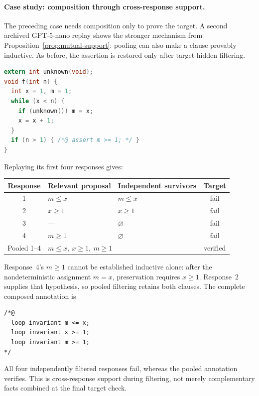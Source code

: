 \noindent\begin{minipage}{\textwidth}
\paragraph{Case study: composition through cross-response support.}
The preceding case needs composition only to prove the target.  A second
archived GPT-5-nano replay shows the stronger mechanism from
Proposition~\ref{prop:mutual-support}: pooling can also make a clause provably
inductive.  As before, the assertion is restored only after target-hidden
filtering.

\begin{lstlisting}[language=C]
extern int unknown(void);
void f(int n) {
  int x = 1, m = 1;
  while (x < n) {
    if (unknown()) m = x;
    x = x + 1;
  }
  if (n > 1) { /*@ assert m >= 1; */ }
}
\end{lstlisting}

Replaying its first four responses gives:
\begin{center}
\small
\setlength{\tabcolsep}{4pt}
\begin{tabular}{cllc}
\toprule
\rowcolor{algobg}
Response & Relevant proposal & Independent survivors & Target \\
\midrule
1 & \(m\leq x\) & \(m\leq x\) & fail \\
2 & \(x\geq1\) & \(x\geq1\) & fail \\
3 & --- & \(\varnothing\) & fail \\
4 & \(m\geq1\) & \(\varnothing\) & fail \\
\midrule
Pooled 1--4 & \multicolumn{2}{l}{\(m\leq x,\ x\geq1,\ m\geq1\)} & verified \\
\bottomrule
\end{tabular}
\end{center}

Response~4's \(m\geq1\) cannot be established inductive alone: after the
nondeterministic assignment \(m=x\), preservation requires \(x\geq1\).
Response~2 supplies that hypothesis, so pooled filtering retains both clauses.
The complete composed annotation is
\begin{lstlisting}
/*@
  loop invariant m <= x;
  loop invariant x >= 1;
  loop invariant m >= 1;
*/
\end{lstlisting}
All four independently filtered responses fail, whereas the pooled annotation
verifies.  This is cross-response support during filtering, not merely
complementary facts combined at the final target check.
\end{minipage}

